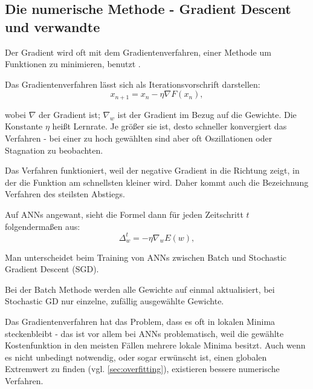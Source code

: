 \subsection{Die numerische Methode - Gradient Descent und verwandte}

Der Gradient wird oft mit dem Gradientenverfahren, einer Methode um Funktionen zu minimieren, benutzt \cite{bishop1995neural,bengio2012practical} 
.

Das Gradientenverfahren lässt sich als Iterationsvorschrift darstellen:
\begin{equation}
x_{n+1}=x_n- \eta  \nabla F(x_n), 
\end{equation}

wobei $\nabla$ der Gradient ist; $\nabla_w$ ist der Gradient im Bezug auf die Gewichte. 
Die Konstante $\eta$ heißt Lernrate. Je größer sie ist, desto schneller konvergiert das Verfahren - bei einer zu hoch gewählten sind aber oft Oszillationen oder Stagnation zu beobachten. 

Das Verfahren funktioniert, weil der negative Gradient in die Richtung zeigt, in der die Funktion am schnellsten kleiner wird. Daher kommt auch die Bezeichnung Verfahren des steilsten Abstiegs.

Auf ANNs angewant, sieht die Formel dann für jeden Zeitschritt $t$ folgendermaßen aus:
\begin{equation}
  \Delta_w^t = - \eta  \nabla_w E(w),
\end{equation}





Man unterscheidet beim Training von ANNs zwischen Batch und Stochastic Gradient Descent (SGD).

Bei der Batch Methode werden alle Gewichte auf einmal aktualisiert, bei Stochastic GD nur einzelne, zufällig ausgewählte Gewichte.

Das Gradientenverfahren hat das Problem, dass es oft in lokalen Minima steckenbleibt - das ist vor allem bei ANNs problematisch, weil die gewählte Kostenfunktion in den meisten Fällen mehrere lokale Minima besitzt. Auch wenn es nicht unbedingt notwendig, oder sogar erwünscht ist, einen globalen Extremwert zu finden (vgl. \ref{sec:overfitting}), existieren bessere numerische Verfahren. 

